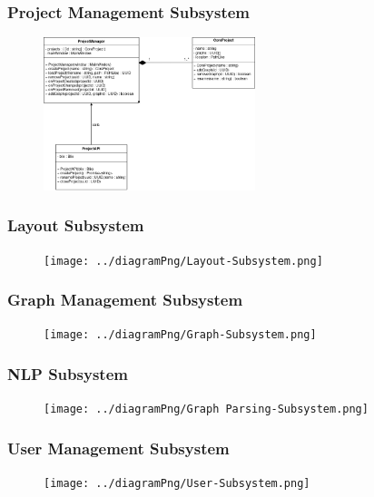 \documentclass[11pt,a4paper]{article}
\begin{document}
\subsubsection*{Project Management Subsystem}
\begin{figure}[htbp]
    \centering
    \includegraphics[width=0.55\textwidth]{../diagramPng/Project-subsystem.png}
\end{figure}

\subsubsection*{Layout Subsystem}
\begin{figure}[htbp]
    \centering
      \texttt{[image: ../diagramPng/Layout-Subsystem.png]}
\end{figure}

\subsubsection*{Graph Management Subsystem}
\begin{figure}[htbp]
  \centering
  \texttt{[image: ../diagramPng/Graph-Subsystem.png]}
\end{figure}


\subsubsection*{NLP Subsystem}
\begin{figure}[htbp]
    \centering
    \texttt{[image: ../diagramPng/Graph Parsing-Subsystem.png]}
\end{figure}

\pagebreak
{}
\subsubsection*{User Management Subsystem}
\begin{figure}[htbp]
    \centering
    \texttt{[image: ../diagramPng/User-Subsystem.png]}
\end{figure}
\end{document}

